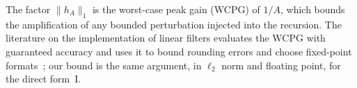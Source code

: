 \documentclass[10pt,conference]{IEEEtran}
\begin{document}
The factor $\|h_A\|_1$ is the worst-case peak gain (WCPG) of $1/A$, which
bounds the amplification of any bounded perturbation injected into the
recursion. The literature on the implementation of linear filters evaluates
the WCPG with guaranteed accuracy and uses it to bound rounding errors and
choose fixed-point formats~\cite{volkova2015wcpg,lopez2014formatting}; our bound is the
same argument, in $\ell_2$ norm and floating point, for the direct form~I.
\end{document}
